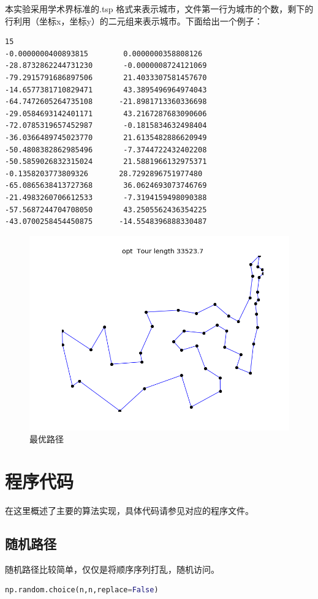 \documentclass{article}
\begin{document}
\begin{CJK}{UTF8}{gkai}
本实验采用学术界标准的.tsp 格式\cite{data1}来表示城市，文件第一行为城市的个数，剩下的行利用（坐标x，坐标y）的二元组来表示城市。下面给出一个例子：
\begin{lstlisting}
15
-0.0000000400893815        0.0000000358808126
-28.8732862244731230       -0.0000008724121069
-79.2915791686897506       21.4033307581457670
-14.6577381710829471       43.3895496964974043
-64.7472605264735108      -21.8981713360336698
-29.0584693142401171       43.2167287683090606
-72.0785319657452987       -0.1815834632498404
-36.0366489745023770       21.6135482886620949
-50.4808382862985496       -7.3744722432402208
-50.5859026832315024       21.5881966132975371
-0.1358203773809326       28.7292896751977480
-65.0865638413727368       36.0624693073746769
-21.4983260706612533       -7.3194159498090388
-57.5687244704708050       43.2505562436354225
-43.0700258454450875      -14.5548396888330487
\end{lstlisting}

\begin{figure}[!h]
	\centering
	\includegraphics[width=.7\linewidth]{00000}
	\caption{最优路径}
	\label{fig:att}
\end{figure}

\section{程序代码}
在这里概述了主要的算法实现，具体代码请参见对应的程序文件。
\subsection{随机路径}
随机路径比较简单，仅仅是将顺序序列打乱，随机访问。
\begin{lstlisting}[language=python]
np.random.choice(n,n,replace=False)
\end{lstlisting}


\end{CJK}
\end{document}
